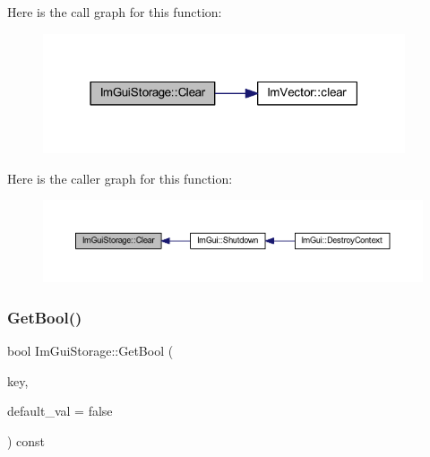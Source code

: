 Here is the call graph for this function\+:
\nopagebreak
\begin{figure}[H]
\begin{center}
\leavevmode
\includegraphics[width=303pt]{struct_im_gui_storage_a72ceecfbca3d08df8c2a232b77890c20_cgraph}
\end{center}
\end{figure}
Here is the caller graph for this function\+:
\nopagebreak
\begin{figure}[H]
\begin{center}
\leavevmode
\includegraphics[width=350pt]{struct_im_gui_storage_a72ceecfbca3d08df8c2a232b77890c20_icgraph}
\end{center}
\end{figure}
\mbox{\label{struct_im_gui_storage_a22d34ae6278f86468a3e7df8fbd1b632}} 
\subsubsection{\texorpdfstring{Get\+Bool()}{GetBool()}}
{\footnotesize\ttfamily bool Im\+Gui\+Storage\+::\+Get\+Bool (\begin{DoxyParamCaption}\item[{\mbox{\hyperlink{imgui_8h_a1785c9b6f4e16406764a85f32582236f}{Im\+Gui\+ID}}}]{key,  }\item[{bool}]{default\+\_\+val = {\ttfamily false} }\end{DoxyParamCaption}) const}

